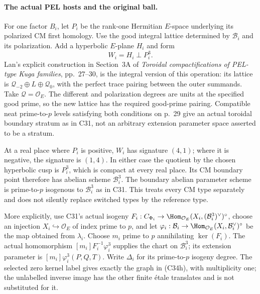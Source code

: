 \paragraph{The actual PEL hosts and the original ball.}
For one factor $B_i$, let $P_i$ be the rank-one
Hermitian $E$-space underlying its polarized
CM first homology. Use the good integral
lattice determined by $\mathcal B_i$ and its
polarization. Add a hyperbolic $E$-plane
$H_i$ and form
\[
                          W_i=H_i\perp P_i^3.          \tag{C34b}
\]
Lan's explicit construction in Section~3A of
\emph{Toroidal compactifications of PEL-type
Kuga families}, pp.~27--30, is the integral
version of this operation: its lattice is
$\mathcal Q_{-2}\oplus L\oplus\mathcal Q_0$,
with the perfect trace pairing between the
outer summands. Take $\mathcal Q=\mathcal O_E$.
The different and polarization degrees are
units at the specified good prime, so the
new lattice has the required good-prime
pairing. Compatible neat prime-to-$p$ levels
satisfying both conditions on p.~29 give
an actual toroidal boundary stratum as in
C31, not an arbitrary extension parameter
space asserted to be a stratum.

At a real place where $P_i$ is positive,
$W_i$ has signature $(4,1)$; where it is
negative, the signature is $(1,4)$. In
either case the quotient by the chosen
hyperbolic cusp is $P_i^3$, which is
compact at every real place. Its CM
boundary point therefore has abelian
scheme $\mathcal B_i^3$.
The boundary abelian parameter scheme
is prime-to-$p$ isogenous to
$\mathcal B_i^3$ as in C31. This treats
every CM type separately and does not
silently replace switched types by the
reference type.

More explicitly, use C31's actual
isogeny $F_i:C_{\Phi_i}\to
\Hom_{\mathcal O_E}(X_i,(\mathcal B_i^3)^\vee)^\circ$,
choose an injection $X_i\hookrightarrow\mathcal O_E$
of index prime to $p$, and let
$\varphi_i:\mathcal B_i\to
\Hom_{\mathcal O_E}(X_i,\mathcal B_i^\vee)^\circ$
be the map obtained from $\lambda_i$.
Choose $m_i$ prime to $p$ annihilating
$\ker(F_i)$. The actual homomorphism
$[m_i]F_i^{-1}\varphi_i^3$ supplies
the chart on $\mathcal B_i^3$; its
extension parameter is
$[m_i]\varphi_i^3(P,Q,T)$.
Write $\Delta_i$ for its prime-to-$p$
isogeny degree. The selected zero
kernel label gives exactly the graph
in (C34h), with multiplicity one;
the unlabelled inverse image has
the other finite \'etale translates
and is not substituted for it.


